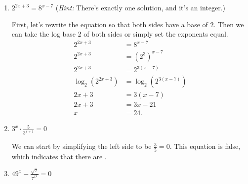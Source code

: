 \documentclass{article}
\begin{document}
\begin{enumerate}[resume]
\begin{enumerate}
  \item
    \begin{problem}[\vfill]
      $2^{2x + 3} = 8^{x - 7}$ (\textit{Hint:} There's exactly one
      solution, and it's an integer.)
    \end{problem}

    \begin{solution}
      First, let's rewrite the equation so that both sides have
      a base of $2$. Then we can take the log base 2 of both sides
      or simply set the exponents equal.
      \begin{align*}
          2^{2x + 3} &= 8^{x - 7} \\
          2^{2x + 3} &= (2^3)^{x - 7} \\
          2^{2x + 3} &= 2^{3(x - 7)} \\
          \log_2(2^{2x + 3}) &= \log_2(2^{3(x - 7)}) \\
          2x+3 &= 3(x-7) \\
          2x + 3 &= 3x - 21 \\
          x &= \boxed{24}.
      \end{align*}
    \end{solution}

  \item
    \begin{problem}[\nstretch{0.75}]
      $\displaystyle 3^x \cdot \frac{5}{3^{x+1}} = 0$
    \end{problem}

    \begin{solution}
      We can start by simplifying the left side to be $\frac{3}{5} = 0$.
      This equation is false, which indicates that there are 
      .
    \end{solution}

  \item
    \begin{problem}[\vfill]
      $\displaystyle 49^{x} - \frac{\sqrt{7}}{7^{x^2}} = 0$
    \end{problem}


\end{enumerate}
\end{enumerate}
\end{document}

